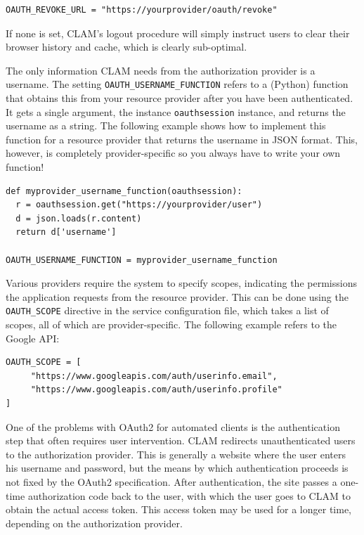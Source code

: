 \documentclass[a4paper,12pt,twoside,openright]{report}
\begin{document}
{ \small
\begin{verbatim}
OAUTH_REVOKE_URL = "https://yourprovider/oauth/revoke"
\end{verbatim}
}

If none is set, CLAM's logout procedure will simply instruct users to clear
their browser history and cache, which is clearly sub-optimal.

The only information CLAM needs from the authorization provider is a username.
The setting \texttt{OAUTH\_USERNAME\_FUNCTION} refers to a (Python) function
that obtains this from your resource provider after you have been
authenticated. It gets a single argument, the instance \texttt{oauthsession}
instance, and returns the username as a string.  The following example shows
how to implement this function for a resource provider that returns the
username in JSON format. This, however, is completely provider-specific so
you always have to write your own function! 

{ \small
\begin{verbatim}
def myprovider_username_function(oauthsession):
  r = oauthsession.get("https://yourprovider/user")
  d = json.loads(r.content)
  return d['username']

OAUTH_USERNAME_FUNCTION = myprovider_username_function
\end{verbatim}
}

Various providers require the system to specify scopes, indicating the
permissions the application requests from the resource provider. This can be
done using the \texttt{OAUTH\_SCOPE} directive in the service configuration
file, which takes a list of scopes, all of which are provider-specific. The
following example refers to the Google API:

{ \small
\begin{verbatim}
OAUTH_SCOPE = [
     "https://www.googleapis.com/auth/userinfo.email",
     "https://www.googleapis.com/auth/userinfo.profile"
]
\end{verbatim}
}

One of the problems with OAuth2 for automated clients is the authentication
step that often requires user intervention. CLAM redirects unauthenticated
users to the authorization provider. This is generally a website where the user
enters his username and password, but the means by which authentication
proceeds is not fixed by the OAuth2 specification. After authentication, the
site passes a one-time authorization code back to the user, with which the user
goes to CLAM to obtain the actual access token. This access token may be used
for a longer time, depending on the authorization provider.
\end{document}
